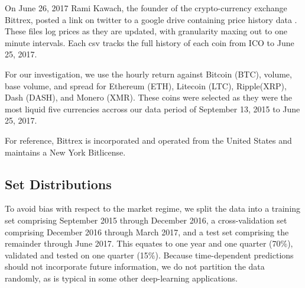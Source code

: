 On June 26, 2017 Rami Kawach, the founder of the crypto-currency exchange Bittrex, posted a link on twitter to a google drive containing price history data \cite{twitter_data}. These files log prices as they are updated, with granularity maxing out to one minute intervals. Each csv tracks the full history of each coin from ICO to June 25, 2017.

For our investigation, we use the hourly return against Bitcoin (BTC), volume, base volume, and spread for Ethereum (ETH), Litecoin (LTC), Ripple(XRP), Dash (DASH), and Monero (XMR). These coins were selected as they were the most liquid five currencies accross our data period of September 13, 2015 to June 25, 2017. 

For reference, Bittrex is incorporated and operated from the United States and maintains a New York Bitlicense. 

\subsection{Set Distributions}

To avoid bias with respect to the market regime, we split the data into a training set comprising September 2015 through December 2016, a cross-validation set comprising December 2016 through March 2017, and a test set comprising the remainder through June 2017. This equates to one year and one quarter (70\%), validated and tested on one quarter (15\%). Because time-dependent predictions should not incorporate future information, we do not partition the data randomly, as is typical in some other deep-learning applications.
